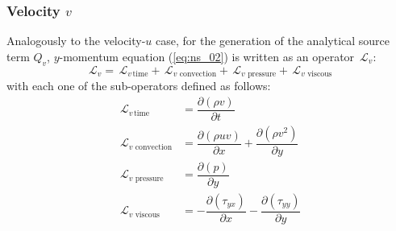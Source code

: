 \documentclass[10pt]{article}
\newcommand{\Diff}[2] {\dfrac{\partial( #1)}{\partial #2}}
\newcommand{\Lo}{\,\mathcal{L}}
\newcommand{\convection}{\,\text{convection}}
\newcommand{\viscous}{\,\text{viscous}}
\newcommand{\pressure}{\,\text{pressure}}
\begin{document}
\subsubsection{Velocity $v$}
Analogously to the velocity-$u$ case, for the generation of the analytical source term $Q_v$, $y$-momentum equation (\ref{eq:ns_02}) is written as an operator $\Lo_v$:
 $$\Lo_v = \Lo_{v \, \text{time}}+\Lo_{v \, \convection}+\Lo_{v \, \pressure }+\Lo_{v \, \viscous }$$
with each one of the sub-operators defined as follows:
\begin{equation*}
 \begin{split}
\Lo_{v \, \text{time}}&= \Diff{\rho v}{t} \\
\Lo_{v \, \convection}&= \Diff{\rho uv }{x}+\Diff{\rho v^2}{y}\\
\Lo_{v \, \pressure }&= \Diff{p}{y}\\
\Lo_{v \, \viscous }&= -\Diff{\tau_{yx}}{x}-\Diff{\tau_{yy}}{y}
 \end{split}
\end{equation*}
\end{document}

